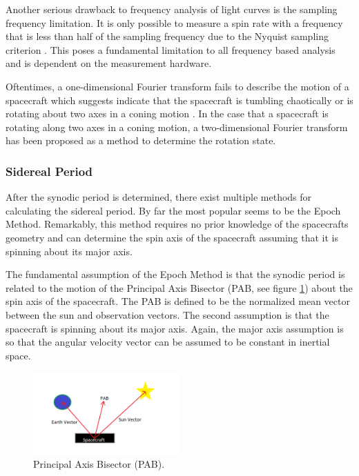 \documentclass{article}
\begin{document}
Another serious drawback to frequency analysis of light curves is the sampling frequency limitation. It is only possible to measure a spin rate with a frequency that is less than half of the sampling frequency due to the Nyquist sampling criterion \cite{SILHA2018844}. This poses a fundamental limitation to all frequency based analysis and is dependent on the measurement hardware. 

Oftentimes, a one-dimensional Fourier transform fails to describe the motion of a spacecraft which suggests indicate that the spacecraft is tumbling chaotically or is rotating about two axes in a coning motion \cite{Hall2014OpticalCO}. In the case that a spacecraft is rotating along two axes in a coning motion, a two-dimensional Fourier transform has been proposed as a method to determine the rotation state.

\subsubsection{Sidereal Period}
After the synodic period is determined, there exist multiple methods for calculating the sidereal period. By far the most popular seems to be the Epoch Method. Remarkably, this method requires no prior knowledge of the spacecrafts geometry and can determine the spin axis of the spacecraft assuming that it is spinning about its major axis. 

The fundamental assumption of the Epoch Method is that the synodic period is related to the motion of the Principal Axis Bisector (PAB, see figure \ref{PAB_im}) about the spin axis of the spacecraft. The PAB is defined to be the normalized mean vector between the sun and observation vectors. The second assumption is that the spacecraft is spinning about its major axis. Again, the major axis assumption is so that the angular velocity vector can be assumed to be constant in inertial space.

\begin{figure}[h]
	\centering
	\includegraphics[width=0.5\textwidth]{PAB}
	\caption{Principal Axis Bisector (PAB).}
	\label{PAB_im}
\end{figure}
\end{document}
